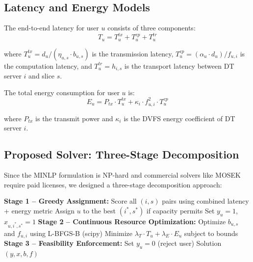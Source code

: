 \documentclass[12pt]{article}
\begin{document}
\subsection{Latency and Energy Models}

The end-to-end latency for user $u$ consists of three components:
\begin{equation}
T_u = T_u^{tx} + T_u^{cp} + T_u^{tr}
\end{equation}

where $T_u^{tx} = d_u / (\eta_{u,s} \cdot b_{u,s})$ is the transmission latency, $T_u^{cp} = (\alpha_u \cdot d_u) / f_{u,i}$ is the computation latency, and $T_u^{tr} = h_{i,s}$ is the transport latency between DT server $i$ and slice $s$.

The total energy consumption for user $u$ is:
\begin{equation}
E_u = P_{tx} \cdot T_u^{tx} + \kappa_i \cdot f_{u,i}^2 \cdot T_u^{cp}
\end{equation}

where $P_{tx}$ is the transmit power and $\kappa_i$ is the DVFS energy coefficient of DT server $i$.

\subsection{Proposed Solver: Three-Stage Decomposition}

Since the MINLP formulation is NP-hard and commercial solvers like MOSEK require paid licenses, we designed a three-stage decomposition approach:

\begin{algorithm}[H]
\caption{Proposed Three-Stage Decomposition Solver}
\begin{algorithmic}[1]
\STATE \textbf{Stage 1 -- Greedy Assignment:}
    \STATE Score all $(i, s)$ pairs using combined latency + energy metric
    \STATE Assign $u$ to the best $(i^*, s^*)$ if capacity permits
    \STATE Set $y_u = 1$, $x_{u,i^*,s^*} = 1$
\ENDFOR
\STATE \textbf{Stage 2 -- Continuous Resource Optimization:}
    \STATE Optimize $b_{u,s}$ and $f_{u,i}$ using L-BFGS-B (scipy)
    \STATE Minimize $\lambda_T \cdot T_u + \lambda_E \cdot E_u$ subject to bounds
\ENDFOR
\STATE \textbf{Stage 3 -- Feasibility Enforcement:}
        \STATE Set $y_u = 0$ (reject user)
    \ENDIF
\ENDFOR
\RETURN Solution $(y, x, b, f)$
\end{algorithmic}
\end{algorithm}
\end{document}
